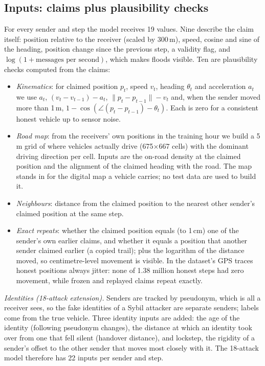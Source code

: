 \documentclass[conference]{IEEEtran}
\begin{document}
\subsection{Inputs: claims plus plausibility checks}
\label{sec:features}
For every sender and step the model receives 19 values. Nine describe the claim itself: position relative to the receiver (scaled by 300\,m),
speed, cosine and sine of the heading, position change since the previous step, a validity flag, and $\log(1+\text{messages per second})$, which
makes floods visible. Ten are plausibility checks computed from the claims:
\begin{itemize}
\item \emph{Kinematics}: for claimed position $p_t$, speed $v_t$, heading $\theta_t$ and acceleration $a_t$ we use $a_t$,
$(v_t-v_{t-1})-a_t$, $\lVert p_t-p_{t-1}\rVert - v_t$ and, when the sender moved more than 1\,m,
$1-\cos(\angle(p_t-p_{t-1})-\theta_t)$. Each is zero for a consistent honest vehicle up to sensor noise.
\item \emph{Road map}: from the receivers' own positions in the training hour we build a 5\,m grid of where vehicles actually drive (675$\times$667
cells) with the dominant driving direction per cell. Inputs are the on-road density at the claimed position and the alignment of the claimed heading
with the road. The map stands in for the digital map a vehicle carries; no test data are used to build it.
\item \emph{Neighbours}: distance from the claimed position to the nearest other sender's claimed position at the same step.
\item \emph{Exact repeats}: whether the claimed position equals (to 1\,cm) one of the sender's own earlier claims, and whether it equals a position
that another sender claimed earlier (a copied trail); plus the logarithm of the distance moved, so centimetre-level movement is visible. In the
dataset's GPS traces honest positions always jitter: none of 1.38 million honest steps had zero movement, while frozen and replayed claims repeat exactly.
\end{itemize}

\emph{Identities (18-attack extension).} Senders are tracked by pseudonym, which is all a receiver sees, so the fake identities of a Sybil attacker
are separate senders; labels come from the true vehicle. Three identity inputs are added: the age of the identity (following pseudonym changes), the
distance at which an identity took over from one that fell silent (handover distance), and lockstep, the rigidity of a sender's offset to the
other sender that moves most closely with it. The 18-attack model therefore has 22 inputs per sender and step.
\end{document}
